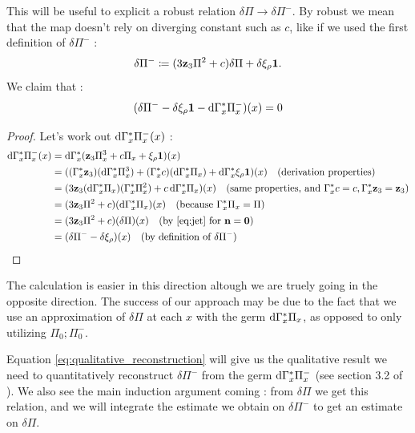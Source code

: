 This will be useful to explicit a robust relation  $\delta \Pi\longrightarrow \delta \Pi ^-$. By robust we mean that the map doesn't rely on diverging constant such as $c$, like if we used the first definition of $\delta \Pi ^-$ : 
$$\delta \Pi ^- \coloneq (3\mathbf{z}_{3}\Pi^2 +c)\delta \Pi + \delta \xi_\rho \mathbf{1}.$$
We claim that : 
\begin{equation}
    (\delta \Pi ^- - \delta \xi_\rho \mathbf{1} - \mathrm{d}\Gamma^*_x \Pi_x^-)(x)=0
    \label{eq:qualitative_reconstruction}
\end{equation} 
\begin{proof}
    Let's work out $\mathrm{d}\Gamma^*_x \Pi_x^- (x)$ :
    \begin{align*}
        \mathrm{d}\Gamma^*_x \Pi_x^- (x) &= \mathrm{d}\Gamma^*_x (\mathbf{z}_{3}\Pi_x^3 + c\Pi_x + \xi_\rho \mathbf{1})(x) \\
        &= ((\Gamma^*_x \mathbf{z}_{3}) (\mathrm{d}\Gamma^*_x \Pi_x^3) + (\Gamma^*_x c) (\mathrm{d}\Gamma^*_x \Pi_x) + \mathrm{d}\Gamma^*_x \xi_\rho \mathbf{1})(x) \quad \text{(derivation properties)}\\
        &= (3\mathbf{z}_{3} (\mathrm{d}\Gamma^*_x \Pi_x) (\Gamma^*_x \Pi_x^2) + c \, \mathrm{d}\Gamma^*_x \Pi_x)(x) \quad \text{(same properties, and } \Gamma^*_x c = c, \Gamma^*_x \mathbf{z}_{3} = \mathbf{z}_{3}) \\
        &= (3\mathbf{z}_{3} \Pi^2 + c)(\mathrm{d}\Gamma^*_x \Pi_x)(x) \quad (\text{because } \Gamma^*_x \Pi_x = \Pi) \\
        &= (3\mathbf{z}_{3} \Pi^2 + c)(\delta \Pi)(x) \quad (\text{by \eqref{eq:jet} for }\mathbf{n} = \mathbf{0})\\
        &= (\delta \Pi^- - \delta \xi_\rho)(x) \quad (\text{by definition of } \delta \Pi^-)
    \end{align*}
\end{proof}
The calculation is easier in this direction altough we are truely going in the opposite direction.
The success of our approach may be due to the fact that we use an approximation of $\delta \Pi$ at each $x$ with the germ $\mathrm{d}\Gamma^*_x \Pi_x$, as opposed to only utilizing $\Pi_0; \Pi_0^-$.

Equation \eqref{eq:qualitative_reconstruction} will give us the qualitative result we need to quantitatively reconstruct $\delta \Pi^-$ from the germ $\mathrm{d}\Gamma^*_x \Pi_x^-$ (see section 3.2 of \cite{BOT_2024}). 
We also see the main induction argument coming : from $\delta \Pi$ we get this relation, and we will integrate the estimate we obtain on $\delta \Pi^-$ to get an estimate on $\delta \Pi$.
